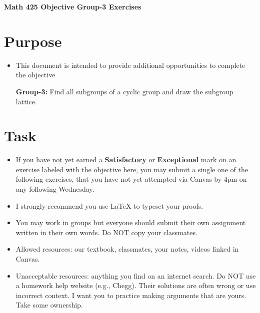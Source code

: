 \documentclass[12pt]{article}
\begin{document}
	\begin{center}
		{\Large \bf Math 425 Objective Group-3 Exercises}
	\end{center}
	\section*{Purpose}
	\begin{itemize}
		\item This document is intended to provide additional opportunities to complete the objective
		
		\textbf{Group-3:} Find all subgroups of a cyclic group and draw the subgroup lattice.
	\end{itemize}
	\section*{Task}
	\begin{itemize}
		\item If you have not yet earned a \textbf{Satisfactory} or \textbf{Exceptional} mark on an exercise labeled with the objective here, you may submit a single one of the following exercises, that you have not yet attempted via Canvas by 4pm on any following Wednesday.
		\item I strongly recommend you use LaTeX to typeset your proofs.
		\item You may work in groups but everyone should submit their own assignment written in their own words.  Do NOT copy your classmates.
		\item Allowed resources: our textbook, classmates, your notes, videos linked in Canvas.
		\item Unacceptable resources: anything you find on an internet search. Do NOT use a homework help website (e.g., Chegg). Their solutions are often wrong or use incorrect context.  I want you to practice making arguments that are yours. Take some ownership.
	\end{itemize}
\end{document}
